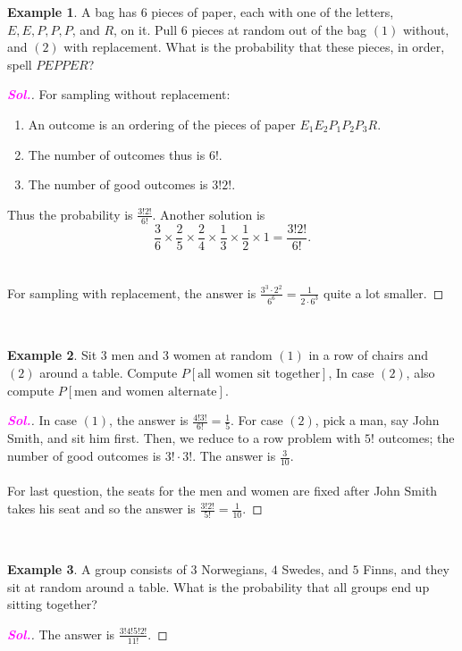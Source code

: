\documentclass[12pt,a4paper]{article}
\theoremstyle{definition}
\newtheorem{example}{Example}[section]
\theoremstyle{definition}
\theoremstyle{definition}
\theoremstyle{definition}
\theoremstyle{remark}
\theoremstyle{definition}
\newcommand{\dispsty}{\displaystyle}
\newcommand{\sol}{\textcolor{magenta}{\bf \textit{Sol.}}\quad}
\begin{document}
\begin{example}
	A bag has $6$ pieces of paper, each with one of the letters, $E, E, P, P, P$, and $R$, on it. Pull $6$ pieces at random out of the bag $(1)$ without, and $(2)$ with replacement. What is the probability that these pieces, in order, spell $PEPPER$?\begin{proof}[\sol]
		For sampling without replacement:\begin{enumerate}
			\item An outcome is an ordering of the pieces of paper $E_1E_2P_1P_2P_3R$.
			\item The number of outcomes thus is $6!$.
			\item The number of good outcomes is $3!2!$.
		\end{enumerate} Thus the probability is $\dispsty\frac{3!2!}{6!}$. Another solution is \[
	\frac{3}{6}\times\frac{2}{5}\times\frac{2}{4}\times\frac{1}{3}\times\frac{1}{2}\times1=\frac{3!2!}{6!}.
	\]\\
	\\ For sampling with replacement, the answer is $\dispsty\frac{3^3\cdot2^2}{6^6}=\frac{1}{2\cdot6^3}$ quite a lot smaller.
	\end{proof}
\end{example}
\ \\
\begin{example}
	Sit 3 men and 3 women at random $(1)$ in a row of chairs and $(2)$ around a table. Compute $P[\text{all women sit together}]$, In case $(2)$, also compute $P[\text{men and women alternate}]$.\begin{proof}[\sol]
		In case $(1)$, the answer is $\dispsty\frac{4!3!}{6!}=\frac{1}{5}$. For case $(2)$, pick a man, say John Smith, and sit him first. Then, we reduce to a row problem with $5!$ outcomes; the number of good outcomes is $3!\cdot 3!$. The answer is $\dispsty\frac{3}{10}$.\\
		\\
		For last question, the seats for the men and women are fixed after John Smith takes his seat and so the answer is $\dispsty\frac{3!2!}{5!}=\frac{1}{10}$.
	\end{proof}
\end{example}
\
\begin{example}
	A group consists of $3$ Norwegians, $4$ Swedes, and $5$ Finns, and they sit at random around a table. What is the probability that all groups end up sitting together?\begin{proof}[\sol]
		The answer is $\dispsty\frac{3!4!5!2!}{11!}$.
	\end{proof}
\end{example}
\end{document}
